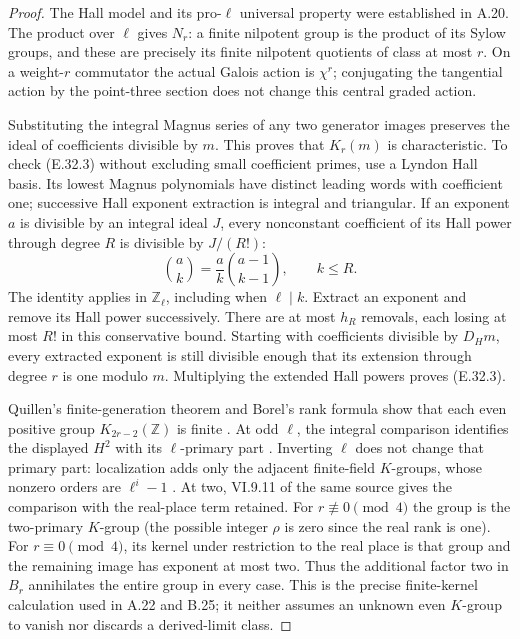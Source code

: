 \begin{proof}
The Hall model and its pro-$\ell$ universal property were established
in A.20.  The product over $\ell$ gives $N_r$: a finite nilpotent
group is the product of its Sylow groups, and these are precisely its
finite nilpotent quotients of class at most $r$.  On a weight-$r$
commutator the actual Galois action is $\chi^r$; conjugating the
tangential action by the point-three section does not change this
central graded action.

Substituting the integral Magnus series of any two generator images
preserves the ideal of coefficients divisible by $m$.  This proves
that $K_r(m)$ is characteristic.  To check (E.32.3) without excluding
small coefficient primes, use a Lyndon Hall basis.  Its lowest Magnus
polynomials have distinct leading words with coefficient one; successive
Hall exponent extraction is integral and triangular.  If an exponent
$a$ is divisible by an integral ideal $J$, every nonconstant coefficient
of its Hall power through degree $R$ is divisible by $J/(R!)$:
\[
           \binom ak=\frac ak\binom{a-1}{k-1},\qquad k\le R.
\]
The identity applies in $\mathbb Z_\ell$, including when $\ell\mid k$.
Extract an exponent and remove its Hall power successively.  There are
at most $h_R$ removals, each losing at most $R!$ in this conservative
bound.  Starting with coefficients divisible by $D_Hm$, every
extracted exponent is still divisible enough that its extension
through degree $r$ is one modulo $m$.  Multiplying the extended
Hall powers proves (E.32.3).

Quillen's finite-generation theorem and Borel's rank formula show
that each even positive group $K_{2r-2}(\mathbb Z)$ is finite
\cite[IV.6.9, author p.59; IV.1.17--1.18, author p.12]{CohWeibelKbook}.
At odd $\ell$, the integral comparison identifies the displayed
$H^2$ with its $\ell$-primary part
\cite[VI.8.2, author p.47]{CohWeibelKbook}.
Inverting $\ell$ does not change that primary part: localization adds
only the adjacent finite-field $K$-groups, whose nonzero orders are
$\ell^i-1$ \cite[IV.1.13; V.6.8]{CohWeibelKbook}.
At two, VI.9.11 of the same source gives the comparison with the
real-place term retained.  For $r\not\equiv0\pmod4$ the group is
the two-primary $K$-group (the possible integer $\rho$ is zero since
the real rank is one).  For $r\equiv0\pmod4$, its kernel under
restriction to the real place is that group and the remaining image
has exponent at most two.  Thus the additional factor two in $B_r$
annihilates the entire group in every case.  This is the precise
finite-kernel calculation used in A.22 and B.25; it neither assumes
an unknown even $K$-group to vanish nor discards a derived-limit class.


\end{proof}
